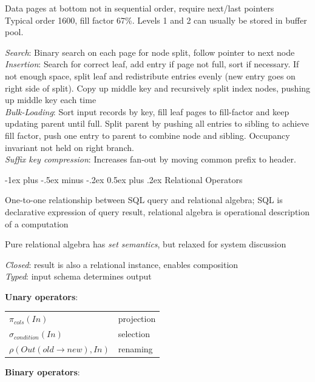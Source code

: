 \documentclass[10pt,landscape]{article}
\makeatletter
\renewcommand{\section}{\@startsection{section}{1}{0mm}%
                                {-1ex plus -.5ex minus -.2ex}%
                                {0.5ex plus .2ex}%
                                {\normalfont\large\bfseries}}
\makeatother
\begin{document}
\begin{multicols}{3}
Data pages at bottom not in sequential order, require next/last pointers \\
Typical order 1600, fill factor 67\%. Levels 1 and 2 can usually be stored in buffer pool.

\textit{Search}: Binary search on each page for node split, follow pointer to next node \\
\textit{Insertion}: Search for correct leaf, add entry if page not full, sort if necessary. If not enough space, split leaf and redistribute entries evenly (new entry goes on right side of split). Copy up middle key and recursively split index nodes, pushing up middle key each time \\
\textit{Bulk-Loading}: Sort input records by key, fill leaf pages to fill-factor and keep updating parent until full. Split parent by pushing all entries to sibling to achieve fill factor, push one entry to parent to combine node and sibling. Occupancy invariant not held on right branch. \\
\textit{Suffix key compression}: Increases fan-out by moving common prefix to header.


\section{Relational Operators}

One-to-one relationship between SQL query and relational algebra; SQL is declarative expression of query result, relational algebra is operational description of a computation

Pure relational algebra has \textit{set semantics}, but relaxed for system discussion

\textit{Closed}: result is also a relational instance, enables composition \\
\textit{Typed}: input schema determines output

\textbf{Unary operators}:

\begin{tabular}{@{}ll@{}}
$\pi_{cols}(In)$                        & projection \\
$\sigma_{condition}(In)$                & selection \\
$\rho(Out(old \rightarrow new), In)$    & renaming
\end{tabular}

\textbf{Binary operators}:


\end{multicols}
\end{document}
